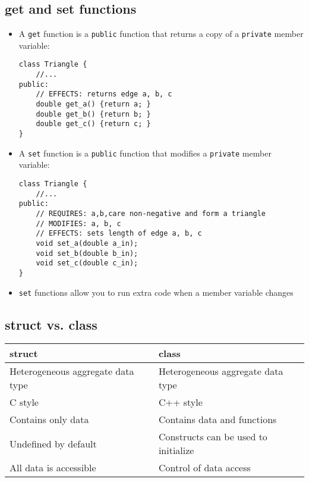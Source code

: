 \subsection{get and set functions}
\begin{itemize}
	\item A \lstinline[style=C++]{get} function is a \lstinline[style=C++]{public} function that returns a copy of a \lstinline[style=C++]{private} member variable:
\begin{lstlisting}[style=C++]
class Triangle {
	//...
public: 
	// EFFECTS: returns edge a, b, c
	double get_a() {return a; }
	double get_b() {return b; }
	double get_c() {return c; }
}
\end{lstlisting}
	\item A \lstinline[style=C++]{set} function is a \lstinline[style=C++]{public} function that modifies a \lstinline[style=C++]{private} member variable:
\begin{lstlisting}[style=C++]
class Triangle {
	//...
public: 
	// REQUIRES: a,b,care non-negative and form a triangle
	// MODIFIES: a, b, c
	// EFFECTS: sets length of edge a, b, c
	void set_a(double a_in);
	void set_b(double b_in);
	void set_c(double c_in);
}
\end{lstlisting}
	\item \lstinline[style=C++]{set} functions allow you to run extra code when a member variable changes
\end{itemize}

\subsection{struct vs. class}
\begin{center}
\begin{tabular}{l|l}
	struct & class \\
	\hline
	Heterogeneous aggregate data type & Heterogeneous aggregate data type \\
	C style & C++ style \\
	Contains only data & Contains data and functions \\
	Undefined by default & Constructs can be used to initialize \\
	All data is accessible & Control of data access \\
\end{tabular}
\end{center}